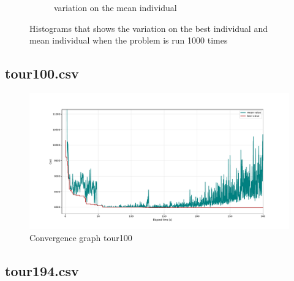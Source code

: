 \documentclass[a4paper,10pt]{article}
\newcommand{\ReplaceMe}[1]{{\color{blue}#1}}
\begin{document}
\begin{figure}[H]
\begin{subfigure}{0.5\linewidth}
      \caption{variation on the mean individual}
      \label{fig:variationmean}
    \end{subfigure}
    \caption{Histograms that shows the variation on the best individual and mean individual when the problem is run 1000 times}
    \label{fig:variations}
  \end{figure}

\subsection{tour100.csv}

\begin{figure}[H]
  \centering
  \includegraphics[width=.8\linewidth]{img/convergence100.pdf}
  \caption{Convergence graph tour100}
  \label{fig:convergence100}
\end{figure}





\subsection{tour194.csv}

\end{document}

